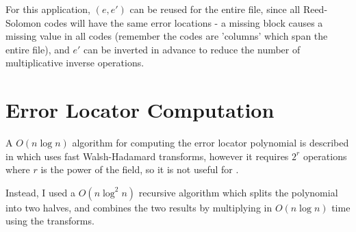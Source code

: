 For this application, $(e, e')$ can be reused for the entire file, since all Reed-Solomon codes will have the same error locations - a missing block causes a missing value in all codes (remember the codes are 'columns' which span the entire file),
and $e'$ can be inverted in advance to reduce the number of multiplicative inverse operations.

\section{Error Locator Computation}

A $O(n \log n)$ algorithm for computing the error locator polynomial is described in \cite{novel-poly} which uses fast Walsh-Hadamard transforms, however it requires $2^r$ operations where $r$ is the power of the field, so it is not useful for .

Instead, I used a $O(n \log^2 n)$ recursive algorithm which splits the polynomial into two halves, and combines the two results by multiplying in $O(n \log n)$ time using the transforms.

